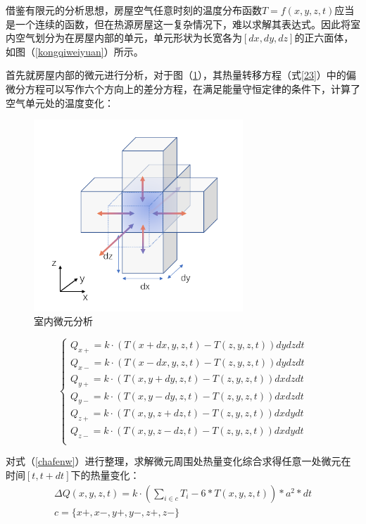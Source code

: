 \documentclass{my_paper}
\begin{document}
借鉴有限元\cite{4}的分析思想，房屋空气任意时刻的温度分布函数$T = f(x,y,z,t)$应当是一个连续的函数，但在热源房屋这一复杂情况下，难以求解其表达式。因此将室内空气划分为在房屋内部的单元，单元形状为长宽各为$[dx,dy,dz]$的正六面体，如图（\ref{kongqiweiyuan}）所示。


首先就房屋内部的微元进行分析，对于图（\ref{wya}），其热量转移方程（式\ref{23}）中的偏微分方程可以写作六个方向上的差分方程，在满足能量守恒定律的条件下，计算了空气单元处的温度变化：

\begin {figure}[h]
\centering %
\includegraphics[width=0.7\textwidth]{wya.png}
\caption{室内微元分析} %
\label{wya}
\end {figure}

\begin{equation}
        \begin{cases}
            Q_{x+} = k \cdot (T(x+dx,y,z,t)-T(z,y,z,t))dydzdt\\
            Q_{x-} = k \cdot (T(x-dx,y,z,t)-T(z,y,z,t))dydzdt\\
            Q_{y+} = k \cdot (T(x,y+dy,z,t)-T(z,y,z,t))dxdzdt\\
            Q_{y-} = k \cdot (T(x,y-dy,z,t)-T(z,y,z,t))dxdzdt\\
            Q_{z+} = k \cdot (T(x,y,z+dz,t)-T(z,y,z,t))dxdydt\\
            Q_{z-} = k \cdot (T(x,y,z-dz,t)-T(z,y,z,t))dxdydt\\
        \end{cases}
        \label{chafenw}
\end{equation}

对式（\ref{chafenw}）进行整理，求解微元周围处热量变化综合求得任意一处微元在时间$[t,t+dt]$下的热量变化：
\begin{equation}
    \begin{aligned}
        \Delta Q(x,y,z,t) = k \cdot (\sum_{i\in c}T_i-6*T(x,y,z,t))*a^2*dt\\
        c = \{x+,x-,y+,y-,z+,z-\}
    \end{aligned}
\label{shi1}
\end{equation}
\end{document}
